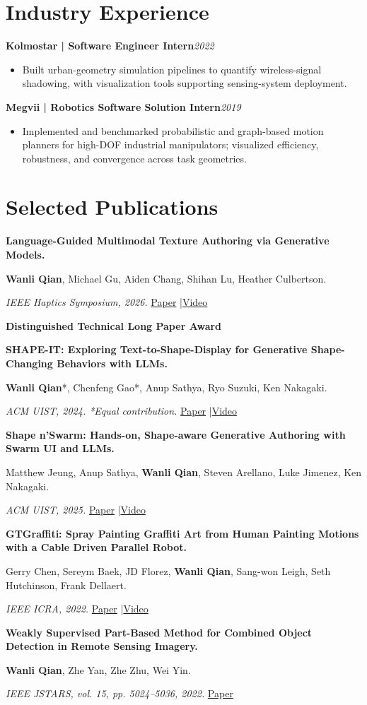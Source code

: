 \documentclass[11pt,letterpaper]{article}
\newcommand{\role}[2]{\textbf{#1}\hfill\textit{#2}\par}
\newcommand{\pub}[3]{\textbf{#1}\par #2\par #3\par\vspace{7pt}}
\begin{document}
\section*{Industry Experience}
\role{Kolmostar | Software Engineer Intern}{2022}
\begin{itemize}
\item Built urban-geometry simulation pipelines to quantify wireless-signal shadowing, with visualization tools supporting sensing-system deployment.
\end{itemize}
\vspace{3pt}
\role{Megvii | Robotics Software Solution Intern}{2019}
\begin{itemize}
\item Implemented and benchmarked probabilistic and graph-based motion planners for high-DOF industrial manipulators; visualized efficiency, robustness, and convergence across task geometries.
\end{itemize}
\newpage
\section*{Selected Publications}
\pub{Language-Guided Multimodal Texture Authoring via Generative Models.}{\textbf{Wanli Qian}, Michael Gu, Aiden Chang, Shihan Lu, Heather Culbertson.}{\textit{IEEE Haptics Symposium, 2026.} \enspace \href{https://arxiv.org/abs/2604.06489}{Paper} \enspace|\enspace \href{https://youtu.be/f5vz52uPw-4}{Video}\par\textbf{Distinguished Technical Long Paper Award}}
\pub{SHAPE-IT: Exploring Text-to-Shape-Display for Generative Shape-Changing Behaviors with LLMs.}{\textbf{Wanli Qian}*, Chenfeng Gao*, Anup Sathya, Ryo Suzuki, Ken Nakagaki.}{\textit{ACM UIST, 2024. *Equal contribution.} \enspace \href{https://dl.acm.org/doi/10.1145/3654777.3676348}{Paper} \enspace|\enspace \href{https://www.youtube.com/watch?v=2NxzOBc7AdQ}{Video}}
\pub{Shape n'Swarm: Hands-on, Shape-aware Generative Authoring with Swarm UI and LLMs.}{Matthew Jeung, Anup Sathya, \textbf{Wanli Qian}, Steven Arellano, Luke Jimenez, Ken Nakagaki.}{\textit{ACM UIST, 2025.} \enspace \href{https://dl.acm.org/doi/10.1145/3746059.3747781}{Paper} \enspace|\enspace \href{https://www.youtube.com/watch?v=5u0M9yL7tyY}{Video}}
\pub{GTGraffiti: Spray Painting Graffiti Art from Human Painting Motions with a Cable Driven Parallel Robot.}{Gerry Chen, Sereym Baek, JD Florez, \textbf{Wanli Qian}, Sang-won Leigh, Seth Hutchinson, Frank Dellaert.}{\textit{IEEE ICRA, 2022.} \enspace \href{https://ieeexplore.ieee.org/document/9812008}{Paper} \enspace|\enspace \href{https://www.youtube.com/watch?v=R4ySYTNGv6s}{Video}}
\pub{Weakly Supervised Part-Based Method for Combined Object Detection in Remote Sensing Imagery.}{\textbf{Wanli Qian}, Zhe Yan, Zhe Zhu, Wei Yin.}{\textit{IEEE JSTARS, vol. 15, pp. 5024--5036, 2022.} \enspace \href{https://ieeexplore.ieee.org/document/9789416}{Paper}}
\end{document}
